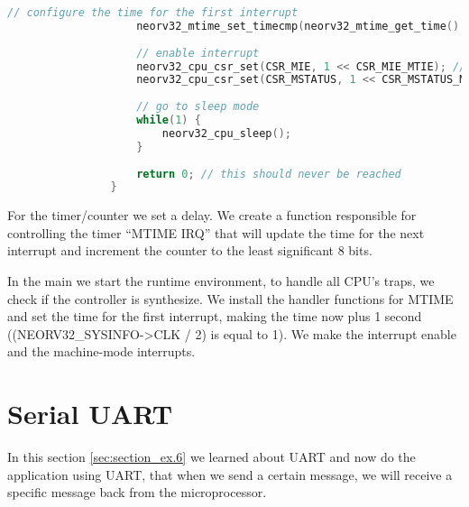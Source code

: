 \begin{lstlisting}[style=mystyle_c, language=c, breaklines]
                    // configure the time for the first interrupt
                    neorv32_mtime_set_timecmp(neorv32_mtime_get_time() + DELAY_S*(NEORV32_SYSINFO->CLK / 2));
                
                    // enable interrupt
                    neorv32_cpu_csr_set(CSR_MIE, 1 << CSR_MIE_MTIE); // enable MTIME interrupt
                    neorv32_cpu_csr_set(CSR_MSTATUS, 1 << CSR_MSTATUS_MIE); // enable machine-mode interrupts
                
                    // go to sleep mode
                    while(1) {
                        neorv32_cpu_sleep();
                    }
                
                    return 0; // this should never be reached
                }            
        \end{lstlisting}

        For the timer/counter we set a delay. We create a function responsible for controlling the timer ``MTIME IRQ'' that will update the time for the next interrupt and increment the counter to the least significant 8 bits.

        In the main we start the runtime environment, to handle all CPU's traps, we check if the controller is synthesize. We install the handler functions for MTIME and set the time for the first interrupt, making the time now plus 1 second ((NEORV32\_SYSINFO->CLK / 2) is equal to 1). We make the interrupt enable and the machine-mode interrupts. 


    
    \section{Serial UART} \label{sec:section_ex.6}

        In this section \autoref{sec:section_ex.6} we learned about UART and now do the application using UART, that when we send a certain message, we will receive a specific message back from the microprocessor.

